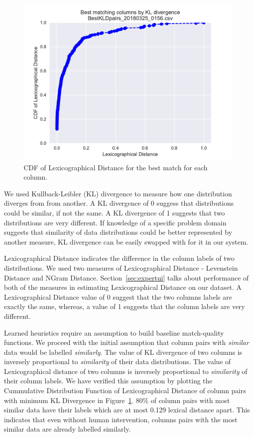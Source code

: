 \begin{figure}
	\centering
	\includegraphics[trim={0 6mm 0 0},clip,width=1\columnwidth]{graphics/CDF_LexDistance1}
	\caption{CDF of Lexicographical Distance for the best match for each column.}
	\label{fig:cdflexdist}
	\trimfigurespacing
\end{figure}

We used Kullback-Leibler (KL) divergence to measure how one distribution diverges from from another. A KL divergence of 0 suggess that distributions could be similar, if not the same. A KL divergence of 1 suggests that two distributions are very different. If knowledge of a specific problem domain suggests that similarity of data distributions could be better represented by another measure, KL divergence can be easily swapped with for it in our system.  

Lexicographical Distance indicates the difference in the column labels of two distributions. We used two measures of Lexicographical Distance - Levenstein Distance and NGram Distance. Section~\ref{sec:expertui} talks about performance of both of the measures in estimating Lexicographical Distance on our dataset. A Lexicographical Distance value of 0 suggest that the two columns labels are exactly the same, whereas, a value of 1 suggests that the column labels are very different.

Learned heuristics require an assumption to build baseline match-quality functions. We proceed with the initial assumption that column pairs with \textit{similar} data would be labelled \textit{similarly}. The value of KL divergence of two columns is inversely proportional to \textit{similarity} of their data distributions. The value of Lexicographical distance of two columns is inversely proportional to \textit{similarity} of their column labels. We have verified this assumption by plotting the Cummulative Distribution Function of Lexicographical Distance of column pairs with minimum KL Divergence in Figure~\ref{fig:cdflexdist}. 80\% of column pairs with most similar data have their labels which are at most 0.129 lexical distance apart. This indicates that even without human intervention, columns pairs with the most similar data are already labelled similarly. 
 
